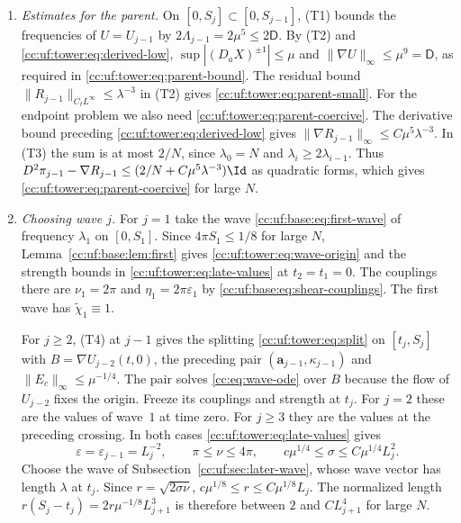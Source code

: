 \begin{enumerate}[leftmargin=*]
\item \emph{Estimates for the parent.}
On $[0,S_j]\subset[0,S_{j-1}]$, (T1) bounds the frequencies of $U=U_{j-1}$
by $2\Lambda_{j-1}=2\mu^5\le2\mathsf D$. By (T2) and
\eqref{cc:uf:tower:eq:derived-low}, $\sup|(D_aX)^{\pm1}|\le\mu$ and
$\|\nabla U\|_\infty\le\mu^9=\mathsf D$, as required in
\eqref{cc:uf:tower:eq:parent-bound}. The residual bound
$\|R_{j-1}\|_{C_tL^\infty}\le\lambda^{-3}$ in (T2) gives
\eqref{cc:uf:tower:eq:parent-small}. For the endpoint problem we also need
\eqref{cc:uf:tower:eq:parent-coercive}. The derivative bound preceding
\eqref{cc:uf:tower:eq:derived-low} gives $\|\nabla R_{j-1}\|_\infty
\le C\mu^5\lambda^{-3}$. In (T3) the sum is at most $2/N$, since $\lambda_0=N$ and
$\lambda_i\ge2\lambda_{i-1}$. Thus
$D^2\pi_{j-1}-\nabla R_{j-1}\le(2/N+C\mu^5\lambda^{-3})\Id$
as quadratic forms, which gives \eqref{cc:uf:tower:eq:parent-coercive} for large $N$.

\item \emph{Choosing wave $j$.}
For $j=1$ take the wave \eqref{cc:uf:base:eq:first-wave} of frequency
$\lambda_1$ on $[0,S_1]$. Since $4\pi S_1\le1/8$ for large $N$,
Lemma~\ref{cc:uf:base:lem:first} gives \eqref{cc:uf:tower:eq:wave-origin}
and the strength bounds in \eqref{cc:uf:tower:eq:late-values} at
$t_2=t_1=0$. The couplings there are $\nu_1=2\pi$ and
$\eta_1=2\pi\varepsilon_1$ by \eqref{cc:uf:base:eq:shear-couplings}.
The first wave has $\widetilde\chi_1\equiv1$.

For $j\ge2$, (T4) at $j-1$ gives the splitting
\eqref{cc:uf:tower:eq:split} on $[t_j,S_j]$ with $B=\nabla U_{j-2}(t,0)$,
the preceding pair $(\mathbf a_{j-1},\kappa_{j-1})$ and
$\|E_c\|_\infty\le\mu^{-1/4}$. The pair solves \eqref{cc:eq:wave-ode}
over $B$ because the flow of $U_{j-2}$ fixes the origin. Freeze its
couplings and strength at $t_j$. For $j=2$ these are the values of
wave~$1$ at time zero. For $j\ge3$ they are the values at the preceding crossing.
In both cases \eqref{cc:uf:tower:eq:late-values} gives
\[
 \varepsilon=\varepsilon_{j-1}=L_j^{-2},\qquad
 \pi\le\nu\le4\pi,\qquad
 c\mu^{1/4}\le\sigma\le C\mu^{1/4}L_j^2 .
\]
Choose the wave of Subsection~\ref{cc:uf:sec:later-wave}, whose wave
vector has length $\lambda$ at $t_j$. Since $r=\sqrt{2\sigma\nu}$,
$c\mu^{1/8}\le r\le C\mu^{1/8}L_j$. The normalized length
$r(S_j-t_j)=2r\mu^{-1/8}L_{j+1}^3$ is therefore between $2$ and
$CL_{j+1}^4$ for large $N$.


\end{enumerate}
